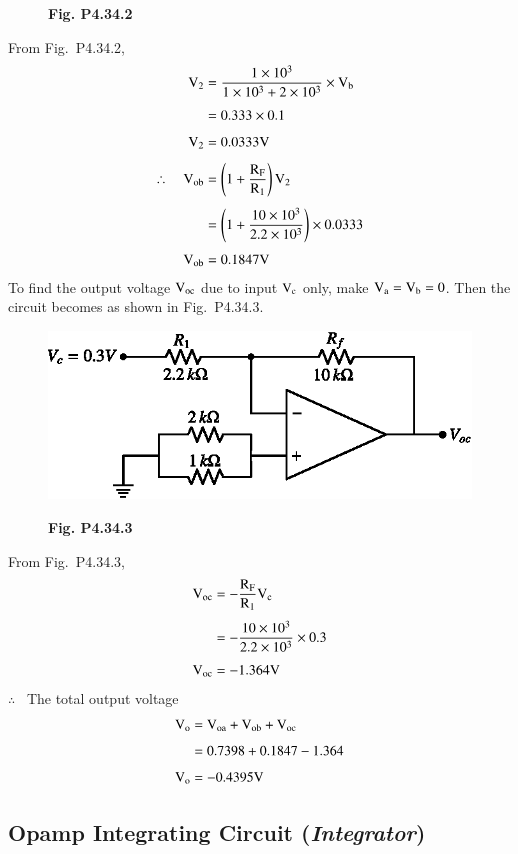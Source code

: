 \begin{solution}
\begin{figure}[H]
\smallskip
{\bf Fig. P4.34.2}
\end{figure}

From Fig.~P4.34.2,
\begin{align*}
\textrm{V}_{2} &= \frac{1\times 10^{3}}{1\times 10^{3}+2\times 10^{3}}\times \textrm{V}_{\textrm{b}}\\[4pt]
&= 0.333\times 0.1\\[4pt]
\textrm{V}_{2} &= 0.0333\textrm{V}\\[4pt]
\therefore\quad \textrm{V}_{\textrm{o}\textrm{b}} &= \left(1+\frac{\textrm{R}_{\textrm{F}}}{\textrm{R}_{1}}\right)\textrm{V}_{2}\\[4pt]
&= \left(1+\frac{10\times 10^{3}}{2.2\times 10^{3}}\right)\times 0.0333\\[3pt]
\textrm{V}_{\textrm{o}\textrm{b}} &= 0.1847\textrm{V}
\end{align*}
To find the output voltage $\textrm{V}_{\textrm{o}\textrm{c}}$ due to input $\textrm{V}_{\textrm{c}}$ only, make $\textrm{V}_{\textrm{a}}=\textrm{V}_{\textrm{b}}=0$. Then the circuit becomes as shown in Fig.~P4.34.3.
\begin{figure}[H]
\centering
\includegraphics{chap4/figP4.33.3.eps}

\smallskip
{\bf Fig. P4.34.3}
\end{figure}

From Fig.~P4.34.3, 
\begin{align*}
\textrm{V}_{\textrm{o}\textrm{c}} &= -\frac{\textrm{R}_{\textrm{F}}}{\textrm{R}_{1}}\textrm{V}_{\textrm{c}}\\[4pt]
&= -\frac{10\times 10^{3}}{2.2\times 10^{3}}\times 0.3\\[4pt]
\textrm{V}_{\textrm{o}\textrm{c}} &=-1.364\textrm{V}
\end{align*}
$\therefore$~ The total output voltage 
\begin{align*}
\textrm{V}_{\textrm{o}} &= \textrm{V}_{\textrm{o}\textrm{a}}+\textrm{V}_{\textrm{o}\textrm{b}}+\textrm{V}_{\textrm{o}\textrm{c}}\\[4pt]
          &= 0.7398+0.1847-1.364\\[4pt]
\textrm{V}_{\textrm{o}} &= -0.4395\textrm{V}
\end{align*}
\end{solution}

\subsection{Opamp Integrating Circuit ({\em Integrator})}\label{sec4.6.5}

